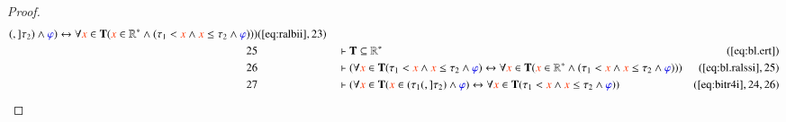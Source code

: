 \begin{proof}
\begin{align}
      (,] \tau_2 ) \wedge \mw{\varphi} ) \leftrightarrow
      \forall \msc{x} \in \mathbf{T} ( \msc{x} \in
      \mathbb{R}^{\ast} \wedge ( \tau_1 < \msc{x} \wedge
      \msc{x} \le \tau_2 \wedge \mw{\varphi} ) )
      )&(\mbox{\ref{eq:ralbii}},23)\notag
  \\ 25 &&  & \vdash \mathbf{T} \subseteq
      \mathbb{R}^{\ast}&(\mbox{\ref{eq:bl.ert}})\notag
  \\ 26 &&  & \vdash ( \forall \msc{x} \in \mathbf{T} ( \tau_1 < \msc{x} \wedge
      \msc{x} \le \tau_2 \wedge \mw{\varphi} )
      \leftrightarrow \forall \msc{x} \in \mathbf{T} (
      \msc{x} \in \mathbb{R}^{\ast} \wedge ( \tau_1 < \msc{x}
      \wedge \msc{x} \le \tau_2 \wedge \mw{\varphi} ) )
      )&(\mbox{\ref{eq:bl.ralssi}},25)\notag
  \\ 27 &&  & \vdash ( \forall \msc{x} \in \mathbf{T} ( \msc{x} \in ( \tau_1
      (,] \tau_2 ) \wedge \mw{\varphi} ) \leftrightarrow
      \forall \msc{x} \in \mathbf{T} ( \tau_1 < \msc{x}
      \wedge \msc{x} \le \tau_2 \wedge \mw{\varphi} )
      )&(\mbox{\ref{eq:bitr4i}},24,26)\notag
\end{align}
\end{proof}

\blalldc

